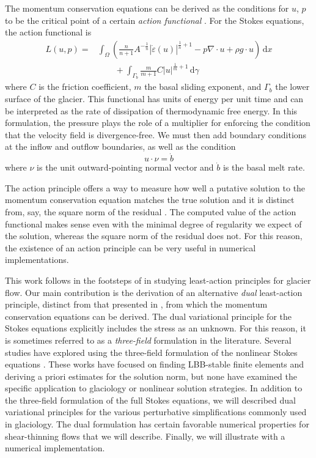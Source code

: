 \documentclass{article}
\theoremstyle{definition}
\theoremstyle{plain}
\newcommand{\ud}{\hspace{2pt}\mathrm{d}}
\begin{document}
The momentum conservation equations can be derived as the conditions for $u$, $p$ to be the critical point of a certain \emph{action functional} \citep{dukowicz2010consistent}.
For the Stokes equations, the action functional is
\begin{align}
    L(u, p) = & \int_\Omega\left(\frac{n}{n + 1}A^{-\frac{1}{n}}|\dot\varepsilon(u)|^{\frac{1}{n} + 1} - p\nabla\cdot u + \rho g\cdot u\right)\ud x \\
    & \qquad + \int_{\Gamma_b}\frac{m}{m + 1}C|u|^{\frac{1}{m} + 1}\ud\gamma
\end{align}
where $C$ is the friction coefficient, $m$ the basal sliding exponent, and $\Gamma_b$ the lower surface of the glacier.
This functional has units of energy per unit time and can be interpreted as the rate of dissipation of thermodynamic free energy.
In this formulation, the pressure plays the role of a multiplier for enforcing the condition that the velocity field is divergence-free.
We must then add boundary conditions at the inflow and outflow boundaries, as well as the condition
\begin{equation}
    u\cdot\nu = \dot b
    \label{eq:basal-dirichlet-bc}
\end{equation}
where $\nu$ is the unit outward-pointing normal vector and $\dot b$ is the basal melt rate.

The action principle offers a way to measure how well a putative solution to the momentum conservation equation matches the true solution and it is distinct from, say, the square norm of the residual \citep{shapero2021icepack}.
The computed value of the action functional makes sense even with the minimal degree of regularity we expect of the solution, whereas the square norm of the residual does not.
For this reason, the existence of an action principle can be very useful in numerical implementations.

This work follows in the footsteps of \citet{dukowicz2010consistent} in studying least-action principles for glacier flow.
Our main contribution is the derivation of an alternative \emph{dual} least-action principle, distinct from that presented in \citet{dukowicz2010consistent}, from which the momentum conservation equations can be derived.
The dual variational principle for the Stokes equations explicitly includes the stress as an unknown.
For this reason, it is sometimes referred to as a \emph{three-field} formulation in the literature.
Several studies have explored using the three-field formulation of the nonlinear Stokes equations \citep{manouzi2001mixed, ervin2008dual, codina2009finite, farhloul2017dual}.
These works have focused on finding LBB-stable finite elements and deriving a priori estimates for the solution norm, but none have examined the specific application to glaciology or nonlinear solution strategies.
In addition to the three-field formulation of the full Stokes equations, we will described dual variational principles for the various perturbative simplifications commonly used in glaciology.
The dual formulation has certain favorable numerical properties for shear-thinning flows that we will describe.
Finally, we will illustrate with a numerical implementation.
\end{document}
